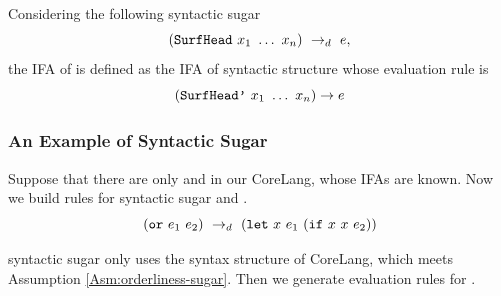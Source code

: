 \begin{Def}
\label{def:ifa-sugar}
Considering the following syntactic sugar 
\[
(\mbox{\tt SurfHead}~x_1~\ldots~x_n) ~\rightarrow_d~ e,
\] 
the IFA of  is defined as the IFA of syntactic structure  whose evaluation rule is
\[
(\mbox{\tt SurfHead'}~x_1~\ldots~x_n) \to e
\]

\end{Def}

\subsubsection{An Example of Syntactic Sugar}

Suppose that there are only  and  in our CoreLang, whose IFAs are known. Now we build rules for syntactic sugar  and .
\[
(\mbox{\tt or}~e_1~e_2) ~\rightarrow_d~ (\mbox{\tt let}~x~e_1~(\mbox{\tt if}~x~x~e_2)) 
\]

 syntactic sugar only uses the syntax structure of CoreLang, which meets Assumption \ref{Asm:orderliness-sugar}. Then we generate evaluation rules for .

